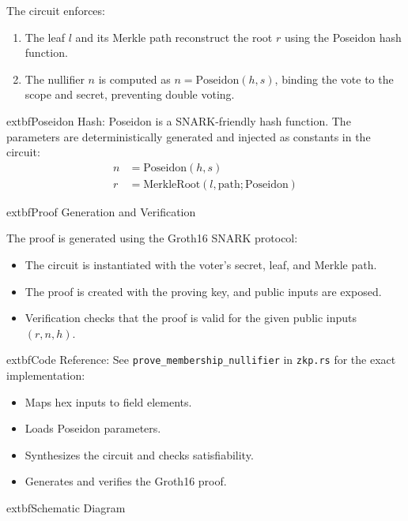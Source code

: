 \documentclass[12pt,a4paper]{report}
\begin{document}
The circuit enforces:
\begin{enumerate}
  \item The leaf $l$ and its Merkle path reconstruct the root $r$ using the Poseidon hash function.
  \item The nullifier $n$ is computed as $n = \text{Poseidon}(h, s)$, binding the vote to the scope and secret, preventing double voting.
\end{enumerate}

	extbf{Poseidon Hash:}
Poseidon is a SNARK-friendly hash function. The parameters are deterministically generated and injected as constants in the circuit:
\begin{align*}
  n &= \text{Poseidon}(h, s) \\
  r &= \text{MerkleRoot}(l, \text{path}; \text{Poseidon})
\end{align*}

	extbf{Proof Generation and Verification}

The proof is generated using the Groth16 SNARK protocol:
\begin{itemize}
  \item The circuit is instantiated with the voter's secret, leaf, and Merkle path.
  \item The proof is created with the proving key, and public inputs are exposed.
  \item Verification checks that the proof is valid for the given public inputs $(r, n, h)$.
\end{itemize}

	extbf{Code Reference:}
See \texttt{prove\_membership\_nullifier} in \texttt{zkp.rs} for the exact implementation:
\begin{itemize}
  \item Maps hex inputs to field elements.
  \item Loads Poseidon parameters.
  \item Synthesizes the circuit and checks satisfiability.
  \item Generates and verifies the Groth16 proof.
\end{itemize}

	extbf{Schematic Diagram}
\end{document}
